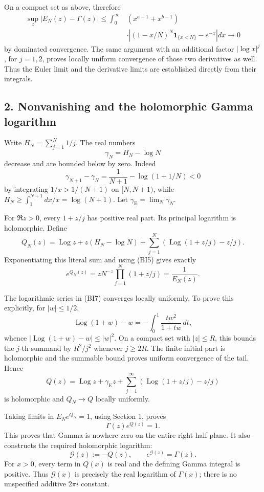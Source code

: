 On a compact set as above, therefore \[
\begin{split}
\sup_z|E_N(z)-\Gamma(z)|
\le\int_0^\infty &(x^{a-1}+x^{b-1})\\
&\cdot\left|(1-x/N)^N\mathbf1_{\{x<N\}}-e^{-x}\right|dx
\longrightarrow0
\end{split}
\] by dominated convergence. The same argument with an additional factor \(|\log x|^j\), for \(j=1,2\), proves locally uniform convergence of those two derivatives as well. Thus the Euler limit and the derivative limits are established directly from their integrals.

\subsection{2. Nonvanishing and the holomorphic Gamma logarithm}\label{GraphV2:nonvanishing-and-the-holomorphic-gamma-logarithm}

Write \(H_N=\sum_{j=1}^N1/j\). The real numbers \[
\gamma_N=H_N-\log N
\] decrease and are bounded below by zero. Indeed \[
\gamma_{N+1}-\gamma_N
=\frac1{N+1}-\log(1+1/N)<0
\] by integrating \(1/x>1/(N+1)\) on \([N,N+1)\), while \(H_N\ge\int_1^{N+1}dx/x=\log(N+1)\). Let \(\gamma_{\mathrm E}=\lim_N\gamma_N\).

For \(\Re z>0\), every \(1+z/j\) has positive real part. Its principal logarithm is holomorphic. Define \[
Q_N(z)=\operatorname{Log}z+z(H_N-\log N)
 +\sum_{j=1}^N\left(\operatorname{Log}(1+z/j)-z/j\right).
\tag{BI7}
\] Exponentiating this literal sum and using (BI5) gives exactly \[
e^{Q_N(z)}
=zN^{-z}\prod_{j=1}^N(1+z/j)=\frac1{E_N(z)}.
\tag{BI8}
\]

The logarithmic series in (BI7) converges locally uniformly. To prove this explicitly, for \(|w|\le1/2\), \[
\operatorname{Log}(1+w)-w
=-\int_0^1\frac{t w^2}{1+tw}\,dt,
\] whence \(|\operatorname{Log}(1+w)-w|\le|w|^2\). On a compact set with \(|z|\le R\), this bounds the \(j\)-th summand by \(R^2/j^2\) whenever \(j\ge2R\). The finite initial part is holomorphic and the summable bound proves uniform convergence of the tail. Hence \[
Q(z)=\operatorname{Log}z+\gamma_{\mathrm E}z
 +\sum_{j=1}^\infty
       \left(\operatorname{Log}(1+z/j)-z/j\right)
\tag{BI9}
\] is holomorphic and \(Q_N\to Q\) locally uniformly.

Taking limits in \(E_N e^{Q_N}=1\), using Section 1, proves \[
\Gamma(z)e^{Q(z)}=1.
\tag{BI10}
\] This proves that Gamma is nowhere zero on the entire right half-plane. It also constructs the required holomorphic logarithm: \[
\mathcal G(z):=-Q(z),\qquad e^{\mathcal G(z)}=\Gamma(z).
\tag{BI11}
\] For \(x>0\), every term in \(Q(x)\) is real and the defining Gamma integral is positive. Thus \(\mathcal G(x)\) is precisely the real logarithm of \(\Gamma(x)\); there is no unspecified additive \(2\pi i\) constant.

